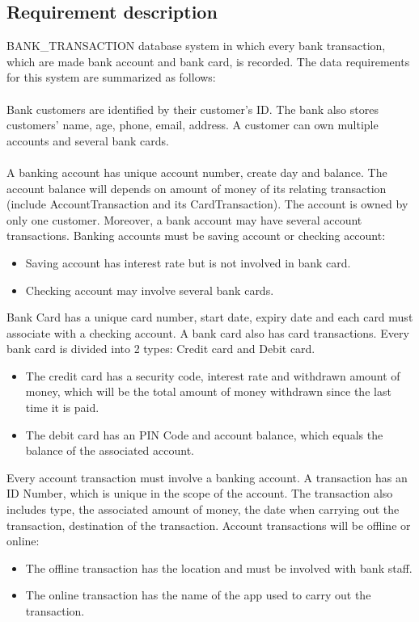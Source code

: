 \documentclass[12pt,a4paper]{article}
\begin{document}
\subsection{Requirement description}
\indent BANK\_TRANSACTION database system in which every bank transaction, which are made bank account and bank card, is recorded. The data requirements for this system are summarized as follows:\\\\
\indent Bank customers are identified by their customer's ID. The bank also stores customers' name, age, phone, email, address. A customer can own multiple accounts and several bank cards.\\\\
\indent A banking account has unique account number, create day and balance. The account balance will depends on amount of money of its relating transaction (include AccountTransaction and its CardTransaction). The account is owned by only one customer. Moreover, a bank account may have several account transactions. Banking accounts must be saving account or checking account:
\begin{itemize}
    \item Saving account has interest rate but is not involved in bank card.
    \item Checking account may involve several bank cards.
\end{itemize}

\indent Bank Card has a unique card number, start date, expiry date and each card must associate with a checking account. A bank card also has card transactions. Every bank card is divided into 2 types: Credit card and Debit card.
\begin{itemize}
    \item The credit card has a security code, interest rate and withdrawn amount of money, which will be the total amount of money withdrawn since the last time it is paid.
    \item The debit card has an PIN Code and account balance, which equals the balance of the associated account.
\end{itemize}

\indent Every account transaction must involve a banking account. A transaction has an ID Number, which is unique in the scope of the account. The transaction also includes type, the associated amount of money, the date when carrying out the transaction, destination of the transaction. Account transactions will be offline or online:
\begin{itemize}
    \item The offline transaction has the location and must be involved with bank staff.
    \item The online transaction has the name of the app used to carry out the transaction.
\end{itemize}
\end{document}

